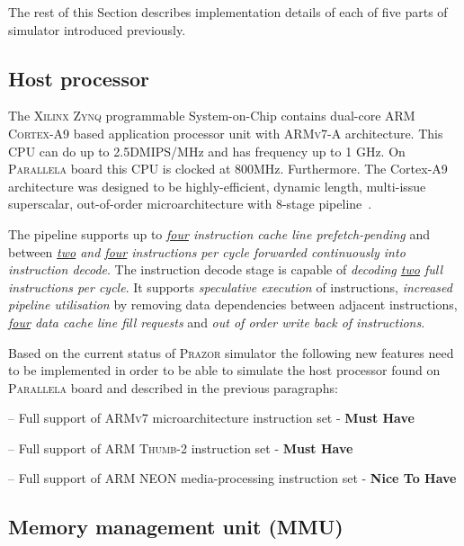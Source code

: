 \documentclass{hitec}
\let\oldmarginpar\marginpar
\renewcommand\marginpar[1]{\-\oldmarginpar[\raggedleft #1]%
{\raggedright #1}}
\newenvironment{checklist}{%
  \begin{list}{}{}%
  \let\olditem\item
  \renewcommand\item{\olditem -- \marginpar{$\Box$} }
  \newcommand\checkeditem{\olditem -- \marginpar{$\CheckedBox$} }
}{%
  \end{list}
}
\begin{document}
The rest of this Section describes implementation details of each of
five parts of simulator introduced previously. 

\subsection{Host processor}
\label{ref:host}
The \textsc{Xilinx Zynq} programmable System-on-Chip contains
dual-core \textsc{ARM Cortex-A9} based application
processor unit with \textsc{ARMv7-A} architecture. This CPU can do up to 2.5DMIPS/MHz and has frequency
up to 1 GHz. On \textsc{Parallela} board this CPU is clocked at
800MHz. Furthermore. The Cortex-A9 architecture was designed to be highly-efficient,
dynamic length, multi-issue superscalar, out-of-order
microarchitecture with 8-stage pipeline~\cite{cortexa9}. 

The pipeline supports up to \textit{\underline{four} instruction cache line prefetch-pending} and
between \textit{\underline{two} and \underline{four} instructions per cycle forwarded continuously
into instruction decode}. The instruction decode stage is capable of
\textit{decoding \underline{two} full instructions per cycle}. It supports \textit{speculative
execution} of instructions, \textit{increased pipeline utilisation} by
removing data dependencies between adjacent instructions,
\textit{\underline{four} data cache line fill requests} and
\textit{out of order write back of instructions}. 

Based on the current status of \textsc{Prazor} simulator the following
new features need to be implemented in order to be able to simulate
the host processor found on \textsc{Parallela} board and described in
the previous paragraphs:

\begin{checklist}
\item Full support of \textsc{ARMv7} microarchitecture instruction set -
  \textbf{Must Have}
\item Full support of \textsc{ARM Thumb-2} instruction set -
  \textbf{Must Have}
\checkeditem Full support of \textsc{ARM NEON} media-processing
instruction set - \textbf{Nice To Have}
\end{checklist}

\subsection{Memory management unit (MMU)}
\label{ref:mmu}
\end{document}
